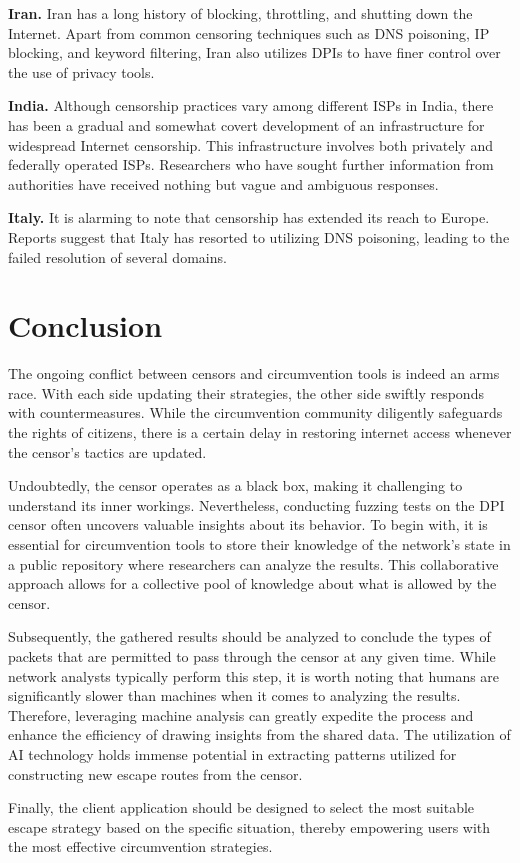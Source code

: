 \textbf{Iran.} Iran has a long history of blocking, throttling, and shutting down the Internet. Apart from common censoring techniques such as DNS poisoning, IP blocking, and keyword filtering, Iran also utilizes DPIs to have finer control over the use of privacy tools.\cite{aryan2013iran}

\textbf{India.} Although censorship practices vary among different ISPs in India, there has been a gradual and somewhat covert development of an infrastructure for widespread Internet censorship. This infrastructure involves both privately and federally operated ISPs. Researchers who have sought further information from authorities have received nothing but vague and ambiguous responses.\cite{yadav2018light}

\textbf{Italy.} It is alarming to note that censorship has extended its reach to Europe. Reports suggest that Italy has resorted to utilizing DNS poisoning, leading to the failed resolution of several domains.\cite{aceto2017italy}

\section{Conclusion}
The ongoing conflict between censors and circumvention tools is indeed an arms race. With each side updating their strategies, the other side swiftly responds with countermeasures. While the circumvention community diligently safeguards the rights of citizens, there is a certain delay in restoring internet access whenever the censor's tactics are updated.

Undoubtedly, the censor operates as a black box, making it challenging to understand its inner workings. Nevertheless, conducting fuzzing tests on the DPI censor often uncovers valuable insights about its behavior. 
To begin with, it is essential for circumvention tools to store their knowledge of the network's state in a public repository where researchers can analyze the results. This collaborative approach allows for a collective pool of knowledge about what is allowed by the censor.

Subsequently, the gathered results should be analyzed to conclude the types of packets that are permitted to pass through the censor at any given time. While network analysts typically perform this step, it is worth noting that humans are significantly slower than machines when it comes to analyzing the results. Therefore, leveraging machine analysis can greatly expedite the process and enhance the efficiency of drawing insights from the shared data. The utilization of AI technology holds immense potential in extracting patterns utilized for constructing new escape routes from the censor. 

Finally, the client application should be designed to select the most suitable escape strategy based on the specific situation, thereby empowering users with the most effective circumvention strategies.
